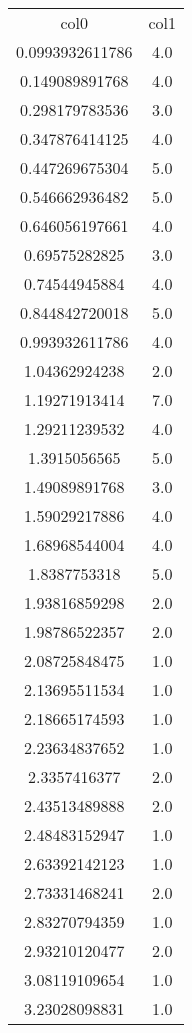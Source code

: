 \begin{table}
\begin{tabular}{cc}
col0 & col1 \\
0.0993932611786 & 4.0 \\
0.149089891768 & 4.0 \\
0.298179783536 & 3.0 \\
0.347876414125 & 4.0 \\
0.447269675304 & 5.0 \\
0.546662936482 & 5.0 \\
0.646056197661 & 4.0 \\
0.69575282825 & 3.0 \\
0.74544945884 & 4.0 \\
0.844842720018 & 5.0 \\
0.993932611786 & 4.0 \\
1.04362924238 & 2.0 \\
1.19271913414 & 7.0 \\
1.29211239532 & 4.0 \\
1.3915056565 & 5.0 \\
1.49089891768 & 3.0 \\
1.59029217886 & 4.0 \\
1.68968544004 & 4.0 \\
1.8387753318 & 5.0 \\
1.93816859298 & 2.0 \\
1.98786522357 & 2.0 \\
2.08725848475 & 1.0 \\
2.13695511534 & 1.0 \\
2.18665174593 & 1.0 \\
2.23634837652 & 1.0 \\
2.3357416377 & 2.0 \\
2.43513489888 & 2.0 \\
2.48483152947 & 1.0 \\
2.63392142123 & 1.0 \\
2.73331468241 & 2.0 \\
2.83270794359 & 1.0 \\
2.93210120477 & 2.0 \\
3.08119109654 & 1.0 \\
3.23028098831 & 1.0 \\
\end{tabular}
\end{table}
